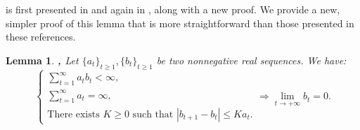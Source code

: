 \documentclass{article} %
\newtheorem{lemma}{Lemma}
\begin{document}
 is first presented in \cite[Proposition 2]{alber1998projected} and again in \cite[Lemma A.5]{mairal2013stochastic}, along with a new proof. We provide a new, simpler proof of this lemma that is more straightforward than those presented in these references.
\begin{lemma}\label{Lemma3}
 \textbf{ \cite[Proposition 2]{alber1998projected} , \cite[Lemma A.5]{mairal2013stochastic} } Let $\{a_t\}_{t \geq 1},\{b_t\}_{t \geq 1}$ be two nonnegative real sequences. We have:
$$
\begin{cases}
     \sum_{t=1}^{\infty} a_t b_t<\infty,\\
     \sum_{t=1}^{\infty} a_t=\infty,\\
     \text{There exists } K \geq 0 \text{ such that } \left|b_{t+1}-b_t\right| \leq K a_t. 
 \end{cases} \Longrightarrow
\lim\limits_{t \rightarrow +\infty} b_t = 0.
$$
\end{lemma}
\noindent
\end{document}
